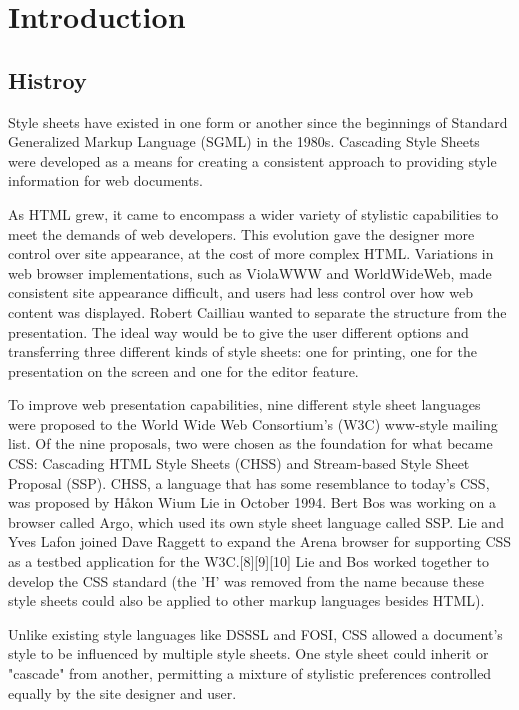 \part{Introduction}


\chapter{Histroy}

Style sheets have existed in one form or another since the beginnings of Standard Generalized Markup Language (SGML) in the 1980s. Cascading Style Sheets were developed as a means for creating a consistent approach to providing style information for web documents.


As HTML grew, it came to encompass a wider variety of stylistic capabilities to meet the demands of web developers. This evolution gave the designer more control over site appearance, at the cost of more complex HTML. Variations in web browser implementations, such as ViolaWWW and WorldWideWeb, made consistent site appearance difficult, and users had less control over how web content was displayed. Robert Cailliau wanted to separate the structure from the presentation. The ideal way would be to give the user different options and transferring three different kinds of style sheets: one for printing, one for the presentation on the screen and one for the editor feature.


To improve web presentation capabilities, nine different style sheet languages were proposed to the World Wide Web Consortium's (W3C) www-style mailing list. Of the nine proposals, two were chosen as the foundation for what became CSS: Cascading HTML Style Sheets (CHSS) and Stream-based Style Sheet Proposal (SSP). CHSS, a language that has some resemblance to today's CSS, was proposed by Håkon Wium Lie in October 1994. Bert Bos was working on a browser called Argo, which used its own style sheet language called SSP. Lie and Yves Lafon joined Dave Raggett to expand the Arena browser for supporting CSS as a testbed application for the W3C.[8][9][10] Lie and Bos worked together to develop the CSS standard (the 'H' was removed from the name because these style sheets could also be applied to other markup languages besides HTML).

Unlike existing style languages like DSSSL and FOSI, CSS allowed a document's style to be influenced by multiple style sheets. One style sheet could inherit or "cascade" from another, permitting a mixture of stylistic preferences controlled equally by the site designer and user.


